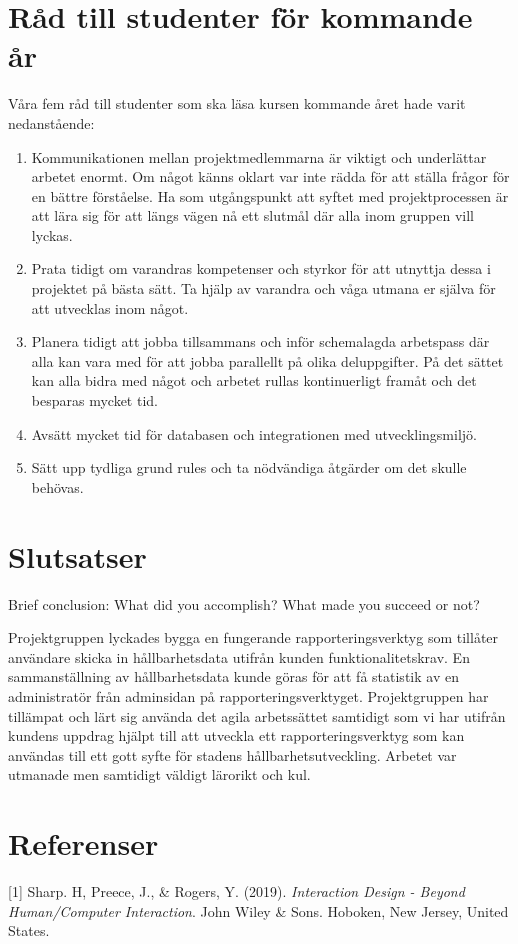 \documentclass[12pt]{article}
\begin{document}
\section{Råd till studenter för kommande år}

Våra fem råd till studenter som ska läsa kursen kommande året hade varit nedanstående:
\begin{enumerate}

\item  Kommunikationen mellan projektmedlemmarna är viktigt och underlättar arbetet enormt. Om något känns oklart var inte rädda för att ställa frågor för en bättre förståelse. Ha som utgångspunkt att syftet med projektprocessen är att lära sig för att längs vägen nå ett slutmål där alla inom gruppen vill lyckas.
\item Prata tidigt om varandras kompetenser och styrkor för att utnyttja dessa i projektet på bästa sätt. Ta hjälp av varandra och våga utmana er själva för att utvecklas inom något. 
\item  Planera tidigt att jobba tillsammans och inför schemalagda arbetspass där alla kan vara med för att jobba parallellt på olika deluppgifter. På det sättet kan alla bidra med något och arbetet rullas kontinuerligt framåt och det besparas mycket tid. 
\item  Avsätt mycket tid för databasen och integrationen med utvecklingsmiljö. 
\item  Sätt upp tydliga grund rules och ta nödvändiga åtgärder om det skulle behövas.        
\end{enumerate}

\section{Slutsatser}
Brief conclusion: What did you accomplish? What made you succeed or not? 

Projektgruppen lyckades bygga en fungerande rapporteringsverktyg som tillåter användare skicka in hållbarhetsdata utifrån kunden funktionalitetskrav. En sammanställning av hållbarhetsdata kunde göras för att få statistik av en administratör från adminsidan på rapporteringsverktyget. Projektgruppen har tillämpat och lärt sig använda det agila arbetssättet samtidigt som vi har utifrån kundens uppdrag hjälpt till att utveckla ett  rapporteringsverktyg som kan användas till ett gott syfte för stadens hållbarhetsutveckling. Arbetet var utmanade men samtidigt väldigt lärorikt och kul. 

\section{Referenser}
[1] Sharp. H, Preece, J., \& Rogers, Y. (2019). \textit{Interaction Design - Beyond Human/Computer Interaction}. John Wiley \& Sons. Hoboken, New Jersey, United States. \\
\end{document}
